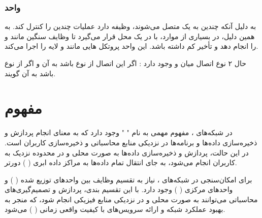 \documentclass[landscape, 12pt]{report}
\begin{document}
\subsubsection*{واحد 
	}
به دلیل آنکه چندین
  به یک
    متصل می‌شوند،
      وظیفه دارد عملیات چندین
        را کنترل ‌کند. به همین دلیل، در بسیاری از موارد،
          با
            در یک محل قرار می‌گیرد تا وظایف سنگین مانند
              و
                را انجام دهد و تأخیر کم داشته باشد. این واحد پروتکل هایی مانند
                  و لایه
                    را اجرا می‌کند.
                    
حال ۲ نوع اتصال میان
  و
    وجود دارد :
اگر این اتصال از نوع
  باشد به آن
    و اگر از نوع
      باشد به آن
        گویند.
        
 \section*{مفهوم 
 	}
در شبکه‌های
 ، مفهوم مهمی به نام "
" وجود دارد که به معنای انجام پردازش و ذخیره‌سازی داده‌ها و برنامه‌ها در نزدیکی منابع محاسباتی و ذخیره‌سازی کاربران است. در این حالت، پردازش و ذخیره‌سازی داده‌ها به صورت محلی و در محدوده نزدیک به کاربران انجام می‌شود، به جای انتقال تمام داده‌ها به مراکز داده ابری ( 
) دورتر.

برای امکان‌سنجی
  در شبکه‌های
   ، نیاز به تقسیم وظایف بین واحدهای توزیع شده (
   ) و واحدهای مرکزی (
	 ) وجود دارد. با این تقسیم بندی، پردازش و تصمیم‌گیری‌های محاسباتی می‌توانند به صورت محلی و در نزدیکی منابع فیزیکی انجام شود، که منجر به بهبود عملکرد شبکه و ارائه سرویس‌های با کیفیت واقعی زمانی (
	 ) می‌شود.
	 
\end{document}
